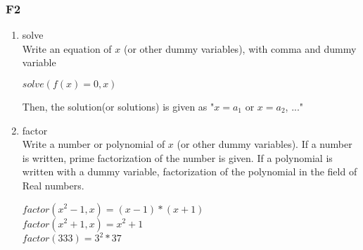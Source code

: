     \subsubsection{F2}
        \begin{enumerate}
            \item solve\\
                Write an equation of $x$ (or other dummy variables), with comma and dummy variable
                \begin{center}
                    $solve(f(x) = 0, x)$
                \end{center}
                Then, the solution(or solutions) is given as "$x = a_1$ or $x = a_2$, ..."
                
            \item factor\\
                Write a number or polynomial of $x$ (or other dummy variables). If a number is written, prime factorization of the number is given. If a polynomial is written with a dummy variable, factorization of the polynomial in the field of Real numbers.
                \begin{center}
                    $factor(x^2 - 1, x) = (x-1)*(x+1)$\\
                    $factor(x^2 + 1, x) = x^2 + 1$\\
                    $factor(333) = 3^2*37$\\
                \end{center}
        \end{enumerate}

